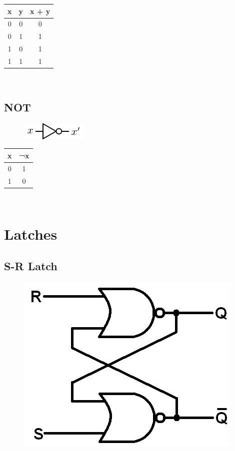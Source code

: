 \begin{tabular}{c c c}
	\hline
	\textbf{x} & \textbf{y} & \textbf{x + y} \\ 
	\hline
	0 & 0 & 0 \\
	0 & 1 & 1 \\
	1 & 0 & 1 \\
	1 & 1 & 1 \\
	\hline 
\end{tabular} \\

\subsection{NOT}

\begin{figure}[h!]
	\includegraphics{./img/not.png}
\end{figure}


\begin{tabular}{c c}
	\hline
	\textbf{x} & \textbf{¬x} \\ 
	\hline
	0 & 1  \\
	1 & 0  \\
	\hline 
\end{tabular} \\

\section{Latches}

\subsection{S-R Latch}

\begin{figure}[h!]
	\includegraphics[scale=0.35]{./img/sr-latch.png}
\end{figure}

